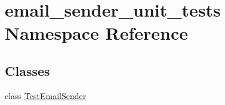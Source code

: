 \hypertarget{namespaceemail__sender__unit__tests}{\section{email\-\_\-sender\-\_\-unit\-\_\-tests Namespace Reference}
\label{namespaceemail__sender__unit__tests}
}
\subsection*{Classes}
\begin{DoxyCompactItemize}
\item 
class \hyperlink{classemail__sender__unit__tests_1_1TestEmailSender}{Test\-Email\-Sender}
\end{DoxyCompactItemize}
